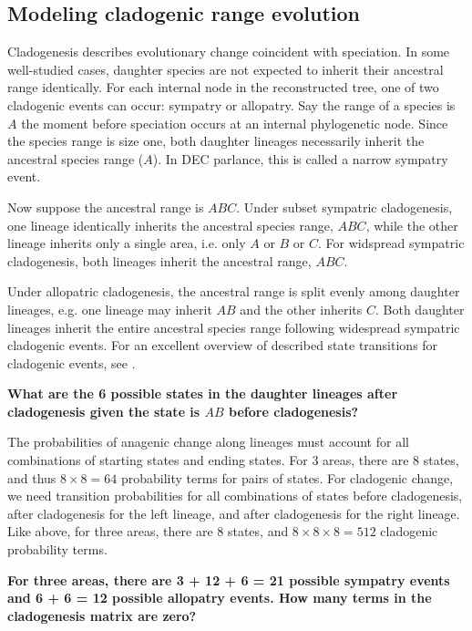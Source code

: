 \subsection{Modeling cladogenic range evolution}

Cladogenesis describes evolutionary change coincident with speciation.
In some well-studied cases, daughter species are not expected to inherit their ancestral range identically.
For each internal node in the reconstructed tree, one of two cladogenic events can occur: sympatry or allopatry.
Say the range of a species is $A$ the moment before speciation occurs at an internal phylogenetic node.
Since the species range is size one, both daughter lineages necessarily inherit the ancestral species range ($A$).
In DEC parlance, this is called a narrow sympatry event.

Now suppose the ancestral range is $ABC$.
Under subset sympatric cladogenesis, one lineage identically inherits the ancestral species range, $ABC$, while the other lineage inherits only a single area, i.e. only $A$ or $B$ or $C$.
For widspread sympatric cladogenesis, both lineages inherit the ancestral range, $ABC$.

Under allopatric cladogenesis, the ancestral range is split evenly among daughter lineages, e.g. one lineage may inherit $AB$ and the other inherits $C$.
Both daughter lineages inherit the entire ancestral species range following widespread sympatric cladogenic events.
For an excellent overview of described state transitions for cladogenic events, see \citet{matzke13}.

{\bf {} What are the 6 possible states in the daughter lineages after cladogenesis given the state is $AB$ before cladogenesis?}

The probabilities of anagenic change along lineages must account for all combinations of starting states and ending states.
For 3 areas, there are 8 states, and thus $8 \times 8 = 64$ probability terms for pairs of states.
For cladogenic change, we need transition probabilities for all combinations of states before cladogenesis, after cladogenesis for the left lineage, and after cladogenesis for the right lineage.
Like above, for three areas, there are 8 states, and $8 \times 8 \times 8 = 512$ cladogenic probability terms.

{\bf {} For three areas, there are 3 + 12 + 6 = 21 possible sympatry events and 6 + 6 = 12 possible allopatry events. How many terms in the cladogenesis matrix are zero?}

